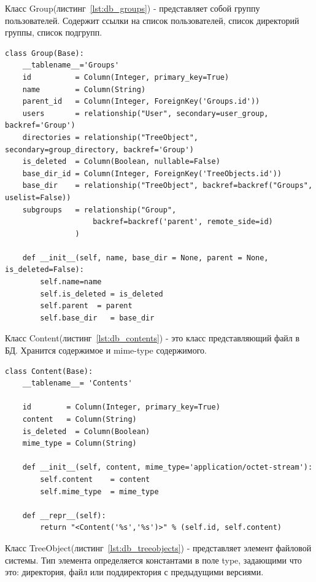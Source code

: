 \documentclass[utf8,usehyperref,12pt]{G7-32}
\begin{document}
Класс Group(листинг~\ref{lst:db_groups}) - представляет собой группу пользователей. Содержит ссылки на список пользователей, список директорий группы, список подгрупп.
\lstset{language=Python,caption=Таблица групп,label=lst:db_groups}
\begin{lstlisting} 
class Group(Base):
    __tablename__='Groups'
    id          = Column(Integer, primary_key=True)    
    name        = Column(String)
    parent_id   = Column(Integer, ForeignKey('Groups.id'))
    users       = relationship("User", secondary=user_group, backref='Group')
    directories = relationship("TreeObject", secondary=group_directory, backref='Group')
    is_deleted  = Column(Boolean, nullable=False)
    base_dir_id = Column(Integer, ForeignKey('TreeObjects.id'))
    base_dir    = relationship("TreeObject", backref=backref("Groups", uselist=False))
    subgroups   = relationship("Group",
                    backref=backref('parent', remote_side=id)
                )
    
    def __init__(self, name, base_dir = None, parent = None, is_deleted=False):
        self.name=name
        self.is_deleted = is_deleted
        self.parent  = parent        
        self.base_dir   = base_dir

\end{lstlisting}


Класс Content(листинг~\ref{lst:db_contents}) - это класс представляющий файл в БД. Хранится содержимое и mime-type содержимого.

\lstset{language=Python,caption=Таблица содержимого,label=lst:db_contents}
\begin{lstlisting} 
class Content(Base):
    __tablename__= 'Contents'

    id        = Column(Integer, primary_key=True)
    content   = Column(String)    
    is_deleted  = Column(Boolean)
    mime_type = Column(String)
    
    def __init__(self, content, mime_type='application/octet-stream'):
        self.content    = content
        self.mime_type  = mime_type

    def __repr__(self):
        return "<Content('%s','%s')>" % (self.id, self.content)

\end{lstlisting}

Класс TreeObject(листинг~\ref{lst:db_treeobjects}) - представляет элемент файловой системы. Тип элемента определяется константами в поле type, задающими что это: директория, файл или поддиректория с предыдущими версиями. 
\end{document}
